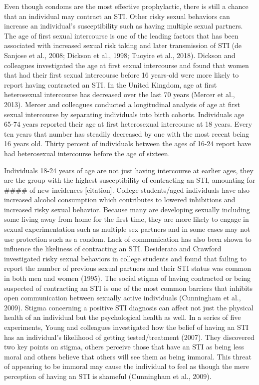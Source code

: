 \documentclass[
  donotrepeattitle,doc, 12pt, a4paper,floatsintext]{apa7}
\begin{document}
Even though condoms are the most effective prophylactic, there is still a chance that an individual may contract an STI. Other risky sexual behaviors can increase an individual's susceptibility such as having multiple sexual partners. The age of first sexual intercourse is one of the leading factors that has been associated with increased sexual risk taking and later transmission of STI (de Sanjose et al., 2008; Dickson et al., 1998; Tuoyire et al., 2018). Dickson and colleagues investigated the age at first sexual intercourse and found that women that had their first sexual intercourse before 16 years-old were more likely to report having contracted an STI. In the United Kingdom, age at first heterosexual intercourse has decreased over the last 70 years (Mercer et al., 2013). Mercer and colleagues conducted a longitudinal analysis of age at first sexual intercourse by separating individuals into birth cohorts. Individuals age 65-74 years reported their age at first heterosexual intercourse at 18 years. Every ten years that number has steadily decreased by one with the most recent being 16 years old. Thirty percent of individuals between the ages of 16-24 report have had heterosexual intercourse before the age of sixteen.

Individuals 18-24 years of age are not just having intercourse at earlier ages, they are the group with the highest susceptibility of contracting an STI, amounting for \#\#\#\# of new incidences {[}citation{]}. College students/aged individuals have also increased alcohol consumption which contributes to lowered inhibitions and increased risky sexual behavior. Because many are developing sexually including some living away from home for the first time, they are more likely to engage in sexual experimentation such as multiple sex partners and in some cases may not use protection such as a condom.
Lack of communication has also been shown to influence the likeliness of contracting an STI. Desiderato and Crawford investigated risky sexual behaviors in college students and found that failing to report the number of previous sexual partners and their STI status was common in both men and women (1995). The social stigma of having contracted or being suspected of contracting an STI is one of the most common barriers that inhibits open communication between sexually active individuals (Cunningham et al., 2009). Stigma concerning a positive STI diagnosis can affect not just the physical health of an individual but the psychological health as well. In a series of five experiments, Young and colleagues investigated how the belief of having an STI has an individual's likelihood of getting tested/treatment (2007). They discovered two key points on stigma, others perceive those that have an STI as being less moral and others believe that others will see them as being immoral. This threat of appearing to be immoral may cause the individual to feel as though the mere perception of having an STI is shameful (Cunningham et al., 2009).
\end{document}
